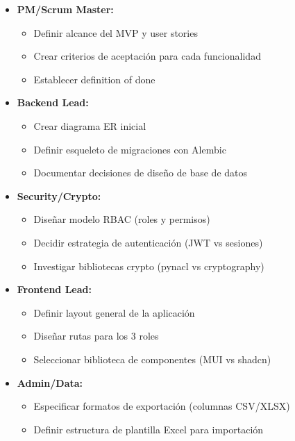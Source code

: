 \documentclass[12pt,a4paper]{article}
\begin{document}
\begin{itemize}[leftmargin=*]
    \item \textbf{PM/Scrum Master:}
    \begin{itemize}
        \item Definir alcance del MVP y user stories
        \item Crear criterios de aceptación para cada funcionalidad
        \item Establecer definition of done
    \end{itemize}
    
    \item \textbf{Backend Lead:}
    \begin{itemize}
        \item Crear diagrama ER inicial
        \item Definir esqueleto de migraciones con Alembic
        \item Documentar decisiones de diseño de base de datos
    \end{itemize}
    
    \item \textbf{Security/Crypto:}
    \begin{itemize}
        \item Diseñar modelo RBAC (roles y permisos)
        \item Decidir estrategia de autenticación (JWT vs sesiones)
        \item Investigar bibliotecas crypto (pynacl vs cryptography)
    \end{itemize}
    
    \item \textbf{Frontend Lead:}
    \begin{itemize}
        \item Definir layout general de la aplicación
        \item Diseñar rutas para los 3 roles
        \item Seleccionar biblioteca de componentes (MUI vs shadcn)
    \end{itemize}
    
    \item \textbf{Admin/Data:}
    \begin{itemize}
        \item Especificar formatos de exportación (columnas CSV/XLSX)
        \item Definir estructura de plantilla Excel para importación
    \end{itemize}
\end{itemize}
\end{document}
